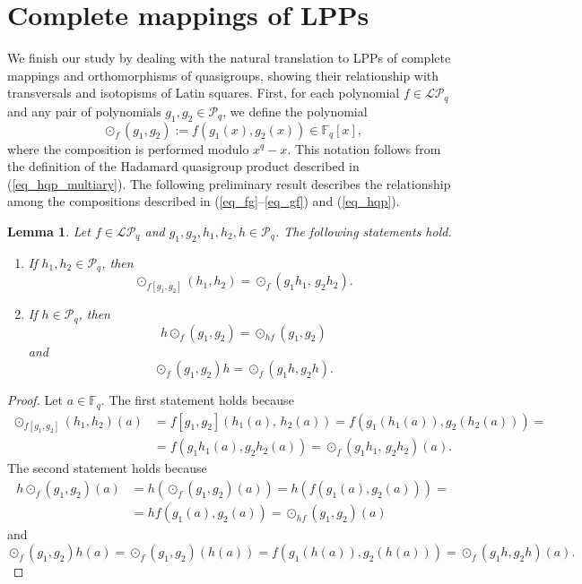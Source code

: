 \documentclass[pdflatex,sn-mathphys-num]{sn-jnl}
\theoremstyle{thmstyleone}%
\newtheorem{lemma}{Lemma}[section]
\begin{document}
\section{Complete mappings of LPPs}\label{sec:Orthomorphism}

We finish our study by dealing with the natural translation to LPPs of complete mappings and orthomorphisms of quasigroups, showing their relationship with transversals and isotopisms of Latin squares. First, for each polynomial $f\in\mathcal{LP}_q$ and any pair of polynomials $g_1,g_2\in\mathcal{P}_q$, we define the polynomial
\begin{equation}\label{eq_hqp}
\odot_f(g_1,g_2):=f(g_1(x),g_2(x))\in\mathbb{F}_q[x],
\end{equation}
where the composition is performed modulo $x^q-x$. This notation follows from the definition of the Hadamard quasigroup product described in (\ref{eq_hqp_multiary}). The following preliminary result describes the relationship among the compositions described in (\ref{eq_fg}--\ref{eq_gf}) and (\ref{eq_hqp}).

\begin{lemma}\label{lemma_hqp_comp}  Let $f\in\mathcal{LP}_q$ and $g_1,g_2,h_1,h_2,h\in\mathcal{P}_q$. The following statements hold.
\begin{enumerate}
    \item If $h_1,h_2\in\mathcal{P}_q$, then
\[\odot_{f[g_1,g_2]}(h_1,h_2)=\odot_f\left(g_1h_1,\,g_2h_2\right).\]
\item If $h\in\mathcal{P}_q$, then
\[h\odot_f(g_1,g_2)=\odot_{hf}(g_1,g_2)\]
and
\[\odot_f(g_1,g_2)h=\odot_{f}(g_1h,g_2h).\]
\end{enumerate}
\end{lemma}

\begin{proof} Let $a\in \mathbb{F}_q$. The first statement holds because
\begin{align*}
\odot_{f[g_1,g_2]}(h_1,h_2)(a) & =f[g_1,g_2](h_1(a),\,h_2(a))=f\left(g_1(h_1(a)),g_2(h_2(a))\right)=\\
&=f\left(g_1h_1(a),g_2h_2(a)\right)=\odot_f\left(g_1h_1,\,g_2h_2\right)(a).
\end{align*}
The second statement holds because
\begin{align*}h\odot_f(g_1,g_2)(a)&=h\left(\odot_f(g_1,g_2)(a)\right)=h\left(f(g_1(a),g_2(a))\right)=\\
& =hf(g_1(a),g_2(a))=\odot_{hf}(g_1,g_2)(a) 
\end{align*}
and
\[\odot_f(g_1,g_2)h(a)=\odot_f(g_1,g_2)(h(a))=f(g_1(h(a)),g_2(h(a)))=\odot_{f}(g_1h,g_2h)(a).\]
\end{proof}
\end{document}
